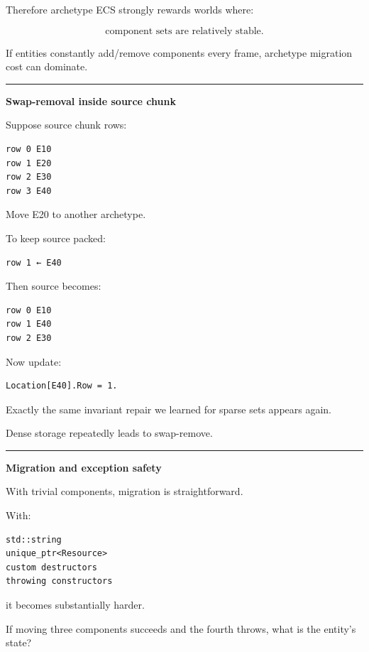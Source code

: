 Therefore archetype ECS strongly rewards worlds where:

\[
\boxed{
\text{component sets are relatively stable}.
}
\]

If entities constantly add/remove components every frame, archetype migration cost can dominate.

\begin{center}\rule{0.5\linewidth}{0.5pt}\end{center}

\textbf{Swap-removal inside source chunk}

Suppose source chunk rows:

\begin{verbatim}
row 0 E10
row 1 E20
row 2 E30
row 3 E40
\end{verbatim}

Move E20 to another archetype.

To keep source packed:

\begin{verbatim}
row 1 ← E40
\end{verbatim}

Then source becomes:

\begin{verbatim}
row 0 E10
row 1 E40
row 2 E30
\end{verbatim}

Now update:

\begin{verbatim}
Location[E40].Row = 1.
\end{verbatim}

Exactly the same invariant repair we learned for sparse sets appears again.

Dense storage repeatedly leads to swap-remove.

\begin{center}\rule{0.5\linewidth}{0.5pt}\end{center}

\textbf{Migration and exception safety}

With trivial components, migration is straightforward.

With:

\begin{verbatim}
std::string
unique_ptr<Resource>
custom destructors
throwing constructors
\end{verbatim}

it becomes substantially harder.

If moving three components succeeds and the fourth throws, what is the entity's state?

